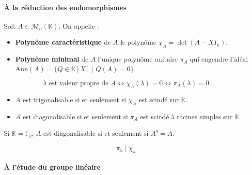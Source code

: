   \paragraph{À la réduction des endomorphismes}


  \begin{definition}
    Soit $A \in \mathcal{M}_n(\mathbb{K})$. On appelle :
    \begin{itemize}
      \item \textbf{Polynôme caractéristique} de $A$ le polynôme $\chi_A = \det(A - XI_n)$.
      \item \textbf{Polynôme minimal} de $A$ l'unique polynôme unitaire $\pi_A$ qui engendre l'idéal $\mathrm{Ann}(A) = \{ Q \in \mathbb{K}[X] \mid Q(A) = 0 \}$.
    \end{itemize}
  \end{definition}


  \begin{proposition}
    \[ \lambda \text{ est valeur propre de } A \iff \chi_A(\lambda) = 0 \iff \pi_A(\lambda) = 0 \]
  \end{proposition}


  \begin{proposition}
    \begin{itemize}
      \item $A$ est trigonalisable si et seulement si $\chi_A$ est scindé sur $\mathbb{K}$.
      \item $A$ est diagonalisable si et seulement si $\pi_A$ est scindé à racines simples sur $\mathbb{K}$.
    \end{itemize}
  \end{proposition}

  \begin{corollary}
    Si $\mathbb{K} = \mathbb{F}_q$, $A$ est diagonalisable si et seulement si $A^q = A$.
  \end{corollary}

  \begin{theorem}
    \[ \pi_u \mid \chi_u \]
  \end{theorem}

  \paragraph{À l'étude du groupe linéaire}

